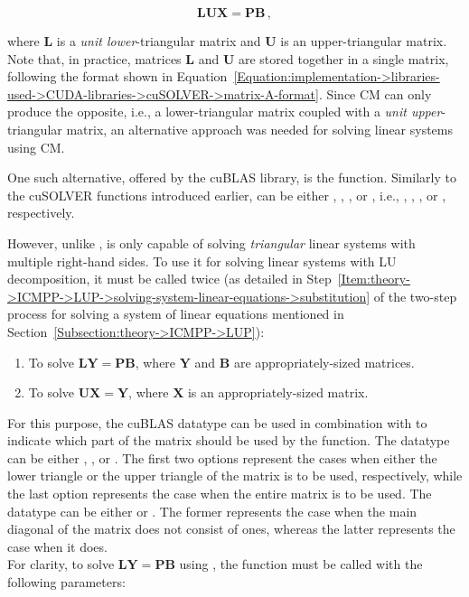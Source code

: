 \begin{equation}
	\mathbf{LUX} = \mathbf{PB} \,,
	\label{Equation:implementation->libraries-used->CUDA-libraries->cuBLAS->cusolverDnXgetrs-system-of-equations}
\end{equation}

where $\mathbf{L}$ is a \textit{unit lower}-triangular matrix and $\mathbf{U}$ is an upper-triangular matrix.
Note that, in practice, matrices $\mathbf{L}$ and $\mathbf{U}$ are stored together in a single matrix, following the format shown in Equation~\ref{Equation:implementation->libraries-used->CUDA-libraries->cuSOLVER->matrix-A-format}.
Since CM can only produce the opposite, i.e., a lower-triangular matrix coupled with a \textit{unit upper}-triangular matrix, an alternative approach was needed for solving linear systems using CM.

One such alternative, offered by the cuBLAS library, is the  function.
Similarly to the cuSOLVER functions introduced earlier,  can be either , , , or , i.e., , , , or , respectively.

However, unlike ,  is only capable of solving \textit{triangular} linear systems with multiple right-hand sides.
To use it for solving linear systems with LU decomposition, it must be called twice (as detailed in Step~\ref{Item:theory->ICMPP->LUP->solving-system-linear-equations->substitution} of the two-step process for solving a system of linear equations mentioned in Section~\ref{Subsection:theory->ICMPP->LUP}):

\begin{enumerate}
	\item To solve $\mathbf{LY}=\mathbf{PB}$, where $\mathbf{Y}$ and $\mathbf{B}$ are appropriately-sized matrices.
	\item To solve $\mathbf{UX}=\mathbf{Y}$, where $\mathbf{X}$ is an appropriately-sized matrix.
\end{enumerate}

For this purpose, the cuBLAS datatype  can be used in combination with  to indicate which part of the matrix should be used by the  function.
The  datatype can be either , , or .
The first two options represent the cases when either the lower triangle or the upper triangle of the matrix is to be used, respectively, while the last option represents the case when the entire matrix is to be used.
The  datatype can be either  or .
The former represents the case when the main diagonal of the matrix does not consist of ones, whereas the latter represents the case when it does.\\
For clarity, to solve $\mathbf{LY}=\mathbf{PB}$ using , the function must be called with the following parameters:

